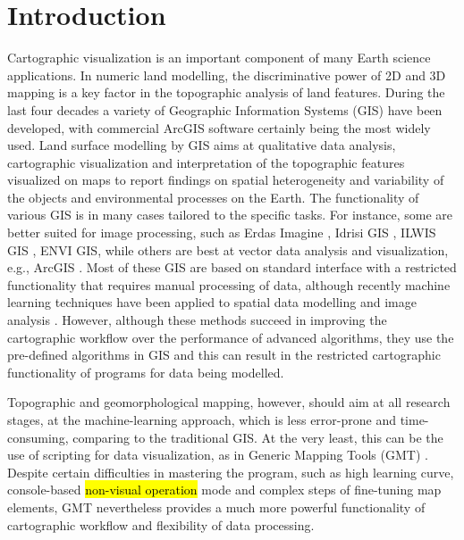 \documentclass[land,article,submit,pdftex,moreauthors]{Definitions/mdpi}
\begin{document}
\section{Introduction}

Cartographic visualization is an important component of many Earth science applications. In numeric land modelling, the discriminative power of 2D and 3D mapping is a key factor in the topographic analysis of land features. During the last four decades a variety of Geographic Information Systems (GIS) have been developed, with commercial ArcGIS software certainly being the most widely used. Land surface modelling by GIS aims at qualitative data analysis, cartographic visualization and interpretation of the topographic features visualized on maps to report findings on spatial heterogeneity and variability of the objects and environmental processes on the Earth. The functionality of various GIS is in many cases tailored to the specific tasks. For instance, some are better suited for image processing, such as Erdas Imagine \cite{IWAHASHI2010202}, Idrisi GIS \cite{land10040379,AYALEW200515}, ILWIS GIS \cite{BABIKER2005127},\hl{ }ENVI GIS, while others are best at vector data analysis and visualization, e.g., ArcGIS \cite{OHTA2022108201,IKEMI2017115,IWAHASHI201229,NAKAYAMA2023110243,HANAOKA2014274}.
Most of these GIS are based on standard interface with a restricted functionality that requires manual processing of data, although recently machine learning techniques have been applied to spatial data modelling \cite{THONGTHAMMACHART2022105447,MAO2022113082} and image analysis \cite{ALIFU2020107365,CARRASCO2022277}. However, although these methods succeed in improving the cartographic workflow over the performance of advanced algorithms, they use the pre-defined algorithms in GIS and this can result in the restricted cartographic functionality of programs for data being modelled.

Topographic and geomorphological mapping, however, should aim at all research stages, at the machine-learning approach, which is less error-prone and time-consuming, comparing to the traditional GIS. At the very least, this can be the use of scripting for data visualization, as in Generic Mapping Tools (GMT) \cite{FARAG2022229297,data7060074}. Despite certain difficulties in mastering the program, such as high learning curve, console-based \hl{non-visual operation} mode and complex steps of fine-tuning map elements, GMT nevertheless provides a much more powerful functionality of cartographic workflow and flexibility of data processing. 
\end{document}
